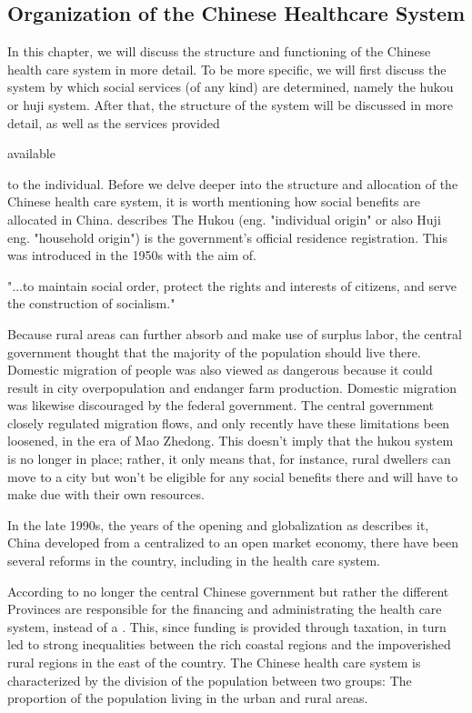 \documentclass[
]{article}
\begin{document}
	\subsection{Organization of the Chinese Healthcare System} \label{orga}
	In this chapter, we will discuss the structure and functioning of the Chinese health care system in more detail. To be more specific, we will first discuss the system by which social services (of any kind) are determined, namely the hukou or huji system. After that, the structure of the system will be discussed in more detail, as well as the services  provided\begin{flushleft}
		available
	\end{flushleft} to the individual. 
	Before we delve deeper into the structure and allocation of the Chinese health care system, it is worth mentioning how social benefits are allocated in China. \cite{liu_institution_2005} describes The Hukou (eng. "individual origin" or also Huji eng. "household origin") is the government's official residence registration. This was introduced in the 1950s with the aim of. 
	
	"...to maintain social order, protect the rights and interests of citizens, and serve the construction of socialism."
	
	Because rural areas can further absorb and make use of surplus labor, the central government thought that the majority of the population should live there.
	Domestic migration of people was also viewed as dangerous because it could result in city overpopulation and endanger farm production.
	Domestic migration was likewise discouraged by the federal government.
	The central government closely regulated migration flows, and only recently have these limitations been loosened, in the era of Mao Zhedong. This doesn't imply that the hukou system is no longer in place; rather, it only means that, for instance, rural dwellers can move to a city but won't be eligible for any social benefits there and will have to make due with their own resources.
	
	In the late 1990s, the years of the opening and globalization as \textcite{kanbur_fifty_2005} describes it, China developed from a centralized to an open market economy, there have been several reforms in the country, including in the health care system. 
	
	According to \textcite{hougaard_chinese_2011} no longer the central Chinese government but rather the different Provinces are responsible for the financing and administrating the health care system, instead of a . This, since funding is provided through taxation, in turn led to strong inequalities between the rich coastal regions and the impoverished rural regions in the east of the country. The Chinese health care system is characterized by the division of the population between two groups: The proportion of the population living in the urban and rural areas. 
	
\end{document}
